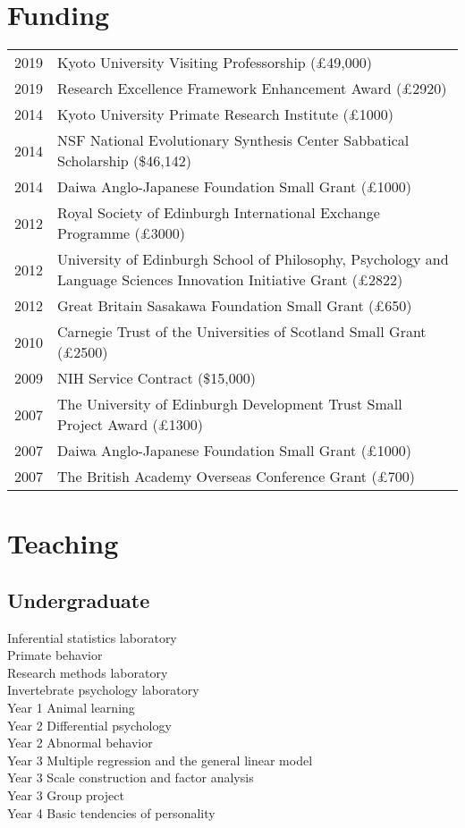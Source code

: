 \documentclass[11pt]{article}
\begin{document}
\section*{Funding}
\begin{tabular}{p{3cm}p{12cm}}
2019 & Kyoto University Visiting Professorship (£49,000) \\
2019 & Research Excellence Framework Enhancement Award (£2920) \\
2014 & Kyoto University Primate Research Institute (£1000) \\
2014 & NSF National Evolutionary Synthesis Center Sabbatical Scholarship (\$46,142) \\
2014 & Daiwa Anglo-Japanese Foundation Small Grant (£1000) \\
2012 & Royal Society of Edinburgh International Exchange Programme (£3000) \\
2012 & University of Edinburgh School of Philosophy, Psychology and
Language Sciences Innovation Initiative Grant (£2822) \\
2012 & Great Britain Sasakawa Foundation Small Grant (£650) \\
2010 & Carnegie Trust of the Universities of Scotland Small Grant
(£2500) \\
2009 & NIH Service Contract (\$15,000) \\
2007 & The University of Edinburgh Development Trust Small Project Award
(£1300) \\
2007 & Daiwa Anglo-Japanese Foundation Small Grant (£1000) \\
2007 & The British Academy Overseas Conference Grant (£700)
\end{tabular}

\section*{Teaching}
\subsection*{Undergraduate}
Inferential statistics laboratory \\
Primate behavior \\
Research methods laboratory \\
Invertebrate psychology laboratory \\
Year 1 Animal learning \\
Year 2 Differential psychology \\
Year 2 Abnormal behavior \\
Year 3 Multiple regression and the general linear model \\
Year 3 Scale construction and factor analysis \\
Year 3 Group project \\
Year 4 Basic tendencies of personality
\end{document}
